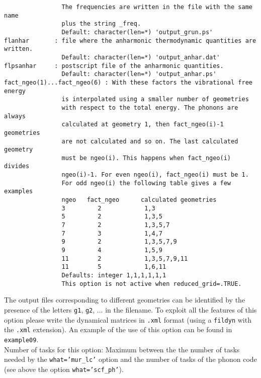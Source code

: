 \documentclass[12pt,a4paper]{article}
\begin{document}
\begin{verbatim}
                The frequencies are written in the file with the same name 
                plus the string _freq.
                Default: character(len=*) 'output_grun.ps'
flanhar       : file where the anharmonic thermodynamic quantities are written.
                Default: character(len=*) 'output_anhar.dat'
flpsanhar     : postscript file of the anharmonic quantities.
                Default: character(len=*) 'output_anhar.ps'
fact_ngeo(1)...fact_ngeo(6) : With these factors the vibrational free energy 
                is interpolated using a smaller number of geometries 
                with respect to the total energy. The phonons are always 
                calculated at geometry 1, then fact_ngeo(i)-1 geometries 
                are not calculated and so on. The last calculated geometry 
                must be ngeo(i). This happens when fact_ngeo(i) divides
                ngeo(i)-1. For even ngeo(i), fact_ngeo(i) must be 1.
                For odd ngeo(i) the following table gives a few examples
                ngeo   fact_ngeo      calculated geometries
                3         2            1,3
                5         2            1,3,5
                7         2            1,3,5,7
                7         3            1,4,7
                9         2            1,3,5,7,9
                9         4            1,5,9
                11        2            1,3,5,7,9,11
                11        5            1,6,11
                Defaults: integer 1,1,1,1,1,1
                This option is not active when reduced_grid=.TRUE.
\end{verbatim}
The output files corresponding to different geometries can be identified
by the presence of the letters \texttt{g1}, \texttt{g2}, ... in the filename.
To exploit all the features of this option please write the dynamical matrices
in \texttt{.xml} format (using a \texttt{fildyn} with the \texttt{.xml}
extension).
An example of the use of this option can be found in \texttt{example09}. \\
Number of tasks for this option: Maximum between the the number of tasks  
needed by the \texttt{what='mur\_lc'} option and the number
of tasks of the phonon code (see above the option \texttt{what='scf\_ph'}). \\
\end{document}
